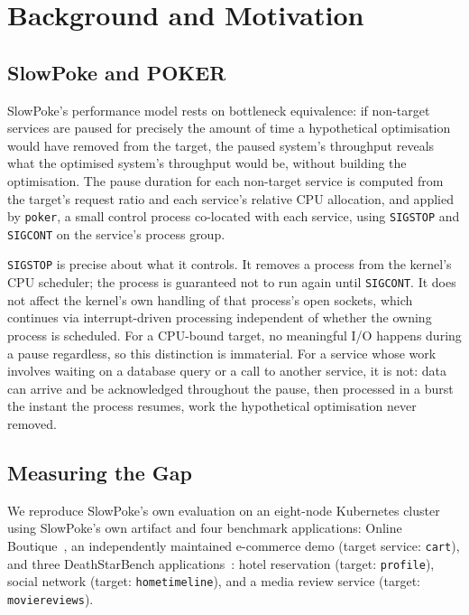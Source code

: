\section{Background and Motivation}
\label{sec:motivation}

\subsection{SlowPoke and POKER}

SlowPoke's performance model rests on bottleneck equivalence: if
non-target services are paused for precisely the amount of time a
hypothetical optimisation would have removed from the target, the paused
system's throughput reveals what the optimised system's throughput would
be, without building the optimisation. The pause duration for each
non-target service is computed from the target's request ratio and each
service's relative CPU allocation, and applied by \texttt{poker}, a small
control process co-located with each service, using \texttt{SIGSTOP} and
\texttt{SIGCONT} on the service's process group.

\texttt{SIGSTOP} is precise about what it controls. It removes a process
from the kernel's CPU scheduler; the process is guaranteed not to run
again until \texttt{SIGCONT}. It does not affect the kernel's own handling
of that process's open sockets, which continues via interrupt-driven
processing independent of whether the owning process is scheduled. For a
CPU-bound target, no meaningful I/O happens during a pause regardless, so
this distinction is immaterial. For a service whose work involves waiting
on a database query or a call to another service, it is not: data can
arrive and be acknowledged throughout the pause, then processed in a
burst the instant the process resumes, work the hypothetical optimisation
never removed.

\subsection{Measuring the Gap}
\label{sec:measuring-gap}

We reproduce SlowPoke's own evaluation on an eight-node Kubernetes cluster
using SlowPoke's own artifact and four benchmark applications: Online
Boutique~\cite{onlineboutique}, an independently maintained e-commerce
demo (target service: \texttt{cart}), and three DeathStarBench
applications~\cite{deathstarbench2019}: hotel reservation (target:
\texttt{profile}), social network (target: \texttt{hometimeline}), and a
media review service (target: \texttt{moviereviews}).

